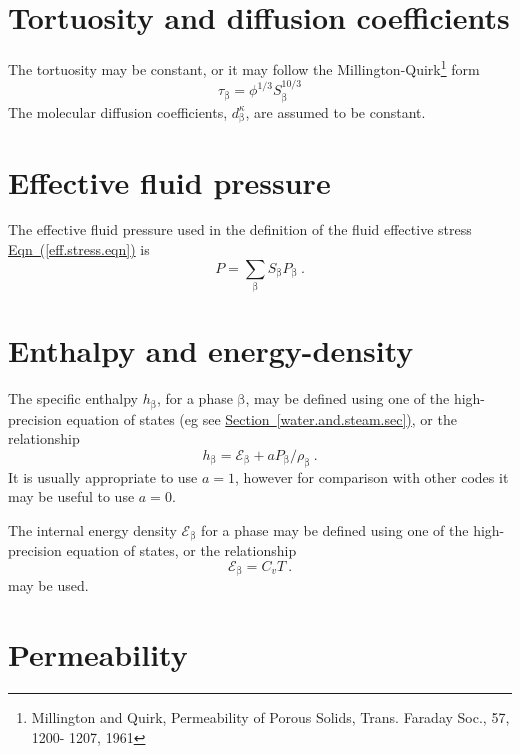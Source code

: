 \documentclass[12pt]{report}
\def\species{\kappa}
\def\phase{\mathrm{\beta}}
\def\energydens{\mathcal{E}}
\begin{document}
\section{Tortuosity and diffusion coefficients}

The tortuosity may be constant, or it may follow the
Millington-Quirk\footnote{Millington and Quirk, Permeability of Porous
  Solids, Trans. Faraday Soc., 57, 1200- 1207, 1961} form
\begin{equation}
\tau_{\phase} = \phi^{1/3}S_{\phase}^{10/3}
\end{equation}
The molecular diffusion coefficients, $d_{\phase}^{\species}$, are
assumed to be constant.

\section{Effective fluid pressure}

The effective fluid pressure used in the definition of the fluid
effective stress \hyperref[eff.stress.eqn]{Eqn~(\ref*{eff.stress.eqn})} is
\begin{equation}
P = \sum_{\phase} S_{\phase}P_{\phase} \ .
\end{equation}

\section{Enthalpy and energy-density}

The specific enthalpy $h_{\phase}$, for a phase $\phase$, may be
defined using one of the high-precision equation of states (eg see
\hyperref[water.and.steam.sec]{Section~\ref*{water.and.steam.sec})},
or the relationship
\begin{equation}
h_{\phase} = \energydens_{\phase} + a P_{\phase}/\rho_{\phase} \ .
\end{equation}
It is usually appropriate to use $a=1$, however for comparison with
other codes it may be useful to use $a=0$.

The internal energy density $\energydens_{\phase}$ for a phase may be
defined using one of the high-precision equation of states, or the
relationship
\begin{equation}
\energydens_{\phase} = C_{v}T \ .
\end{equation}
may be used.


\section{Permeability}
\label{perm.sec}
\end{document}

